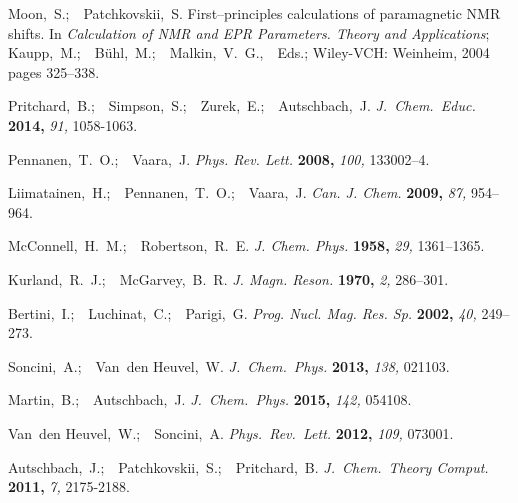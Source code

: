 \documentclass[11pt]{report}
\begin{document}
%
% 
%

\providecommand{\refin}[1]{\\ \textbf{Referenced in:} #1}
\begin{thebibliography}{10}

Moon,~S.;\ \ Patchkovskii,~S.  First--principles calculations of paramagnetic
  {NMR} shifts.   In  \textit{Calculation of {NMR} and {EPR} {P}arameters.
  {T}heory and {A}pplications}; Kaupp,~M.;\ \ B{\"u}hl,~M.;\ \ Malkin,~V.~G.,\
  \ Eds.;  Wiley-VCH: Weinheim, 2004 pages 325--338.

Pritchard,~B.;\ \ Simpson,~S.;\ \ Zurek,~E.;\ \ Autschbach,~J. \textit{J.\
  Chem.\ Educ.} \textbf{2014,} \textsl{91,} 1058-1063.

Pennanen,~T.~O.;\ \ Vaara,~J. \textit{Phys. Rev. Lett.} \textbf{2008,}
  \textsl{100,} 133002--4.

Liimatainen,~H.;\ \ Pennanen,~T.~O.;\ \ Vaara,~J. \textit{Can. J. Chem.}
  \textbf{2009,} \textsl{87,} 954--964.

McConnell,~H.~M.;\ \ Robertson,~R.~E. \textit{J. Chem. Phys.} \textbf{1958,}
  \textsl{29,} 1361--1365.

Kurland,~R.~J.;\ \ McGarvey,~B.~R. \textit{J. Magn. Reson.} \textbf{1970,}
  \textsl{2,} 286--301.

Bertini,~I.;\ \ Luchinat,~C.;\ \ Parigi,~G. \textit{Prog. Nucl. Mag. Res. Sp.}
  \textbf{2002,} \textsl{40,} 249--273.

Soncini,~A.;\ \ Van~den Heuvel,~W. \textit{J.\ Chem.\ Phys.} \textbf{2013,}
  \textsl{138,} 021103.

Martin,~B.;\ \ Autschbach,~J. \textit{J.\ Chem.\ Phys.} \textbf{2015,}
  \textsl{142,} 054108.

Van~den Heuvel,~W.;\ \ Soncini,~A. \textit{Phys.\ Rev.\ Lett.} \textbf{2012,}
  \textsl{109,} 073001.

Autschbach,~J.;\ \ Patchkovskii,~S.;\ \ Pritchard,~B. \textit{J.\ Chem.\ Theory
  Comput.} \textbf{2011,} \textsl{7,} 2175-2188.

\end{thebibliography}
\end{document}
